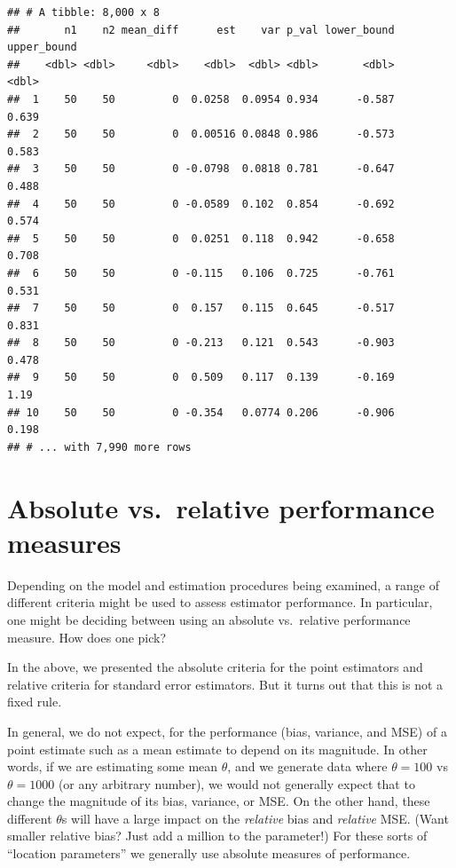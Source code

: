 \documentclass[
]{book}
\begin{document}
\begin{verbatim}
## # A tibble: 8,000 x 8
##       n1    n2 mean_diff      est    var p_val lower_bound upper_bound
##    <dbl> <dbl>     <dbl>    <dbl>  <dbl> <dbl>       <dbl>       <dbl>
##  1    50    50         0  0.0258  0.0954 0.934      -0.587       0.639
##  2    50    50         0  0.00516 0.0848 0.986      -0.573       0.583
##  3    50    50         0 -0.0798  0.0818 0.781      -0.647       0.488
##  4    50    50         0 -0.0589  0.102  0.854      -0.692       0.574
##  5    50    50         0  0.0251  0.118  0.942      -0.658       0.708
##  6    50    50         0 -0.115   0.106  0.725      -0.761       0.531
##  7    50    50         0  0.157   0.115  0.645      -0.517       0.831
##  8    50    50         0 -0.213   0.121  0.543      -0.903       0.478
##  9    50    50         0  0.509   0.117  0.139      -0.169       1.19 
## 10    50    50         0 -0.354   0.0774 0.206      -0.906       0.198
## # ... with 7,990 more rows
\end{verbatim}

\hypertarget{absolute-vs.-relative-performance-measures}{%
\section{Absolute vs.~relative performance measures}\label{absolute-vs.-relative-performance-measures}}

Depending on the model and estimation procedures being examined, a range of different criteria might be used to assess estimator performance.
In particular, one might be deciding between using an absolute vs.~relative performance measure.
How does one pick?

In the above, we presented the absolute criteria for the point estimators and relative criteria for standard error estimators.
But it turns out that this is not a fixed rule.

In general, we do not expect, for the performance (bias, variance, and MSE) of a point estimate such as a mean estimate to depend on its magnitude.
In other words, if we are estimating some mean \(\theta\), and we generate data where \(\theta = 100\) vs \(\theta = 1000\) (or any arbitrary number), we would not generally expect that to change the magnitude of its bias, variance, or MSE.
On the other hand, these different \(\theta\)s will have a large impact on the \emph{relative} bias and \emph{relative} MSE.
(Want smaller relative bias? Just add a million to the parameter!)
For these sorts of ``location parameters'' we generally use absolute measures of performance.
\end{document}
